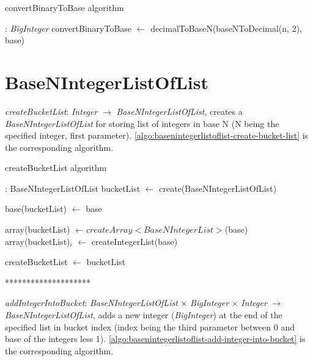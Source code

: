 \documentclass[book, nodocumentinfo]{upmethodology-document}
\newcommand{\separator}{\centerline{********************}}
\begin{document}
\begin{algorithm}[H]
    \caption{convertBinaryToBase algorithm}
    \label{algo:basenintegerlist-convert-binary-to-base}

    \begin{algorithmic}
         : \emph{BigInteger}
            \State convertBinaryToBase \(\leftarrow\) decimalToBaseN(baseNToDecimal(n, 2), base)
        \EndFunction
    \end{algorithmic}
\end{algorithm}

\section{BaseNIntegerListOfList}

\emph{createBucketList}: \emph{Integer} \(\rightarrow\) \emph{BaseNIntegerListOfList},
creates a \emph{BaseNIntegerListOfList} for storing list of integers in base N (N being the specified integer, first parameter).
\ref{algo:basenintegerlistoflist-create-bucket-list} is the corresponding algorithm.

\begin{algorithm}[H]
    \caption{createBucketList algorithm}
    \label{algo:basenintegerlistoflist-create-bucket-list}

    \begin{algorithmic}
         : BaseNIntegerListOfList
            \State bucketList \(\leftarrow\) create(BaseNIntegerListOfList)

            \State base(bucketList) \(\leftarrow\) base

            \State array(bucketList) \(\leftarrow createArray<BaseNIntegerList>\)(base)
                \State array(bucketList)\(_i\) \(\leftarrow\) createIntegerList(base)
            \EndFor

            \State createBucketList \(\leftarrow\) bucketList
        \EndFunction
    \end{algorithmic}
\end{algorithm}

\separator

\emph{addIntegerIntoBucket}: \emph{BaseNIntegerListOfList} \(×\) \emph{BigInteger} \(×\) \emph{Integer} \(\rightarrow\) \emph{BaseNIntegerListOfList},
adds a new integer (\emph{BigInteger}) at the end of the specified list in bucket index (index being the third parameter between 0 and base of the integers less 1).
\ref{algo:basenintegerlistoflist-add-integer-into-bucket} is the corresponding algorithm.
\end{document}
